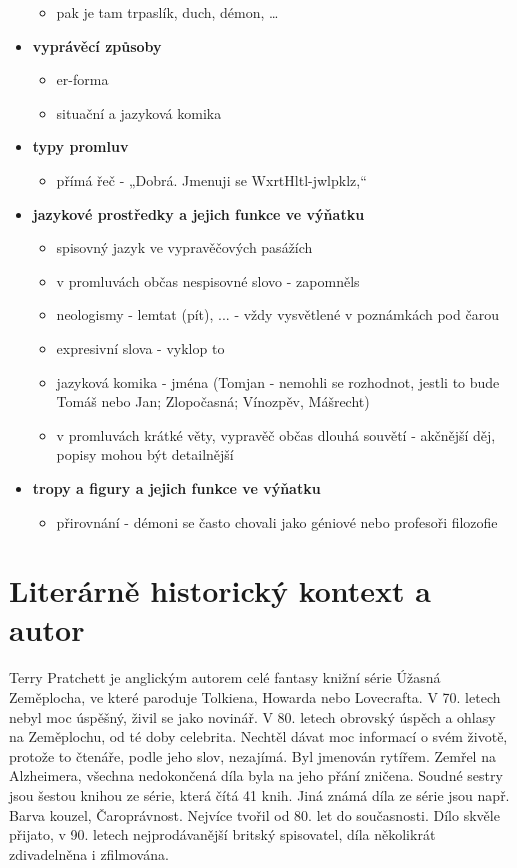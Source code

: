\documentclass[11pt]{article}
\begin{document}
\begin{itemize}
\begin{itemize}
            \item pak je tam trpaslík, duch, démon, \dots
        \end{itemize}
        \item\textbf{vyprávěcí způsoby}
        \begin{itemize}
            \item er-forma
            \item situační a jazyková komika
        \end{itemize}
        \item\textbf{typy promluv}
        \begin{itemize}
            \item přímá řeč - „Dobrá. Jmenuji se WxrtHltl-jwlpklz,“
        \end{itemize}
        \item\textbf{jazykové prostředky a jejich funkce ve výňatku}
        \begin{itemize}
            \item spisovný jazyk ve vypravěčových pasážích
            \item v promluvách občas nespisovné slovo - zapomněls
            \item neologismy - lemtat (pít), ... - vždy vysvětlené v poznámkách pod čarou
            \item expresivní slova - vyklop to
            \item jazyková komika - jména (Tomjan - nemohli se rozhodnot, jestli to bude Tomáš nebo Jan; Zlopočasná; Vínozpěv, Mášrecht)
            \item v promluvách krátké věty, vypravěč občas dlouhá souvětí - akčnější děj, popisy mohou být detailnější
        \end{itemize}
        \item\textbf{tropy a figury a jejich funkce ve výňatku}
        \begin{itemize}
            \item přirovnání - démoni se často chovali jako géniové nebo profesoři filozofie
        \end{itemize}
    \end{itemize}
    \section*{Literárně historický kontext a autor}
    Terry Pratchett je anglickým autorem celé fantasy knižní série Úžasná Zeměplocha, ve které paroduje Tolkiena, Howarda nebo Lovecrafta.
    V 70. letech nebyl moc úspěšný, živil se jako novinář. V 80. letech obrovský úspěch a ohlasy na Zeměplochu, od té doby celebrita.
    Nechtěl dávat moc informací o svém životě, protože to čtenáře, podle jeho slov, nezajímá.
    Byl jmenován rytířem. Zemřel na Alzheimera, všechna nedokončená díla byla na jeho přání zničena.
    Soudné sestry jsou šestou knihou ze série, která čítá 41 knih. Jiná známá díla ze série jsou např. Barva kouzel, Čaroprávnost.
    Nejvíce tvořil od 80. let do současnosti.
    Dílo skvěle přijato, v 90. letech nejprodávanější britský spisovatel, díla několikrát zdivadelněna i zfilmována.
    
\end{document}
